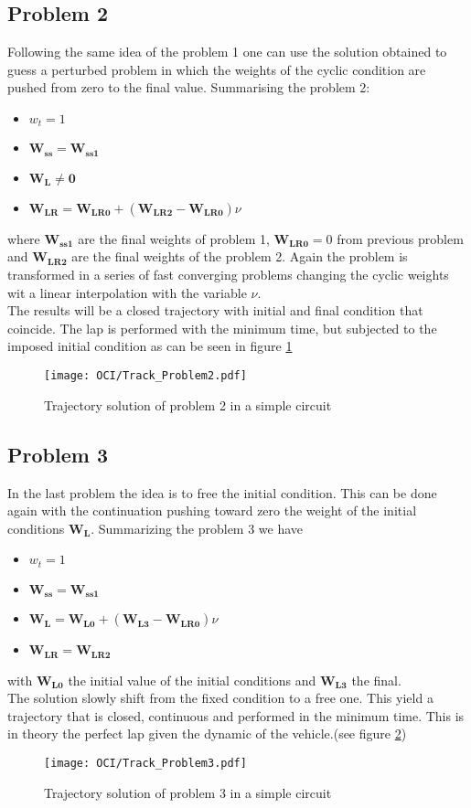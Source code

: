 \subsection{Problem 2}
%
Following the same idea of the problem 1 one can use the solution obtained to guess a perturbed problem in which the weights of the cyclic condition are pushed from zero to the final value. Summarising the problem 2:
\begin{itemize}
    \item $w_t = 1 $
    \item $\mathbf{W_{ss}} = \mathbf{W_{ss1}} $
    \item $\mathbf{W_{L}} \neq \mathbf{0}  $
    \item $\mathbf{W_{LR}} = \mathbf{W_{LR0}} + (\mathbf{W_{LR2}}-\mathbf{W_{LR0}})\nu$
\end{itemize}
where $\mathbf{W_{ss1}}$ are the final weights of problem 1, $\mathbf{W_{LR0}}=0$ from previous problem and $\mathbf{W_{LR2}}$ are the final weights of the problem 2. Again the problem is transformed in a series of fast converging problems changing the cyclic weights wit a linear interpolation with the variable $\nu$.\\
The results will be a closed trajectory with initial and final condition that coincide. The lap is performed with the minimum time, but subjected to the imposed initial condition as can be seen in figure \ref{fig:Problem2}
%
\begin{figure}[h!]
    \centering
    \texttt{[image: OCI/Track\_Problem2.pdf]}
    \caption{Trajectory solution of problem 2 in a simple circuit}
    \label{fig:Problem2}
\end{figure}
%
\subsection{Problem 3}
%
In the last problem the idea is to free the initial condition. This can be done again with the continuation pushing toward zero the weight of the initial conditions $\mathbf{W_{L}}$. Summarizing the problem 3 we have
\begin{itemize}
    \item $w_t = 1 $
    \item $\mathbf{W_{ss}} = \mathbf{W_{ss1}} $
    \item $\mathbf{W_{L}}  = \mathbf{W_{L0}} + (\mathbf{W_{L3}}-\mathbf{W_{LR0}})\nu $
    \item $\mathbf{W_{LR}} = \mathbf{W_{LR2}}$
\end{itemize}
with $\mathbf{W_{L0}}$ the initial value of the initial conditions and $\mathbf{W_{L3}}$ the final.\\
The solution slowly shift from the fixed condition to a free one. This yield a trajectory that is closed, continuous and performed in the minimum time. This is in theory the perfect lap given the dynamic of the vehicle.(see figure \ref{fig:Problem3})
%
\begin{figure}[h!]
    \centering
    \texttt{[image: OCI/Track\_Problem3.pdf]}
    \caption{Trajectory solution of problem 3 in a simple circuit}
    \label{fig:Problem3}
\end{figure}
%
